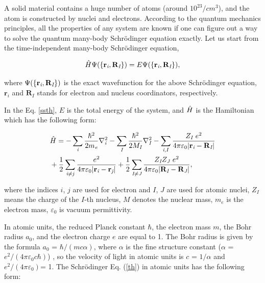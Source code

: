\documentclass[a4paper, 12pt, titlepage,oneside,drop]{kthesis}
\begin{document}
\noindent A solid material contains a huge number of atoms (around $10^{23}/cm^3$), and the atom is constructed by nuclei and electrons. 
According to the quantum mechanics principles, all the properties of any system are known if one can figure out a way to solve 
the quantum many-body Schrödinger equation exactly. Let us start from the time-independent many-body Schrödinger equation,

\begin{equation}\label{ssth}
 {\hat{H}} {\Psi(\{ {\textbf r}_{\textit i}, {\textbf R}_{\textit I} \})} = {E} {\Psi(\{ {\textbf r}_{\textit i}, {\textbf R}_{\textit I} \})},
\end{equation}

where $\Psi(\{ {\textbf r}_{\textit i}, {\textbf R}_{\textit I} \})$  is the exact wavefunction for the above Schrödinger equation, $\textbf{r}_\textit{i}$ and $\textbf{R}_\textit{I}$  stands for electron and
nucleus coordinators, respectively.

In the Eq. \ref{ssth}, $E$ is the total energy of the system, and $\hat{H}$ is the Hamiltonian which has the following form:

\begin{equation}\label{th}
\begin{split}
& \hath = - \sumi<i> {\frac{\hbar^{2}}{2 m_{\textit e}}}   \nablaia<i> - \sumi<I> {\frac{\hbar^{2}}{2 M_\textit{I}}} \nablaia<I>  - \sumij<i><I> \frac{Z_\textit{I}\ e^2}{4 \pi \varepsilon_0 |\textbf{r}_\textit{i}-\textbf{R}_\textit{I}|} \\
& + \frac{1}{2} \suminj<i><j> \frac{ e^2}{4 \pi \varepsilon_0 |\textbf{r}_\textit{i}-\textbf{r}_\textit{j}|} + \frac{1}{2} \suminj<I><J> \frac{Z_\textit{I} Z_\textit{J}\  e^2}{4 \pi \varepsilon_0 |\textbf{R}_\textit{I}-\textbf{R}_\textit{J}|},
\end{split}
\end{equation}

where the indices $\textit{i}$, $\textit{j}$ are used for electron and $\textit{I}$, $\textit{J}$ are used for atomic nuclei, $Z_\textit{I}$ means the charge of the $\textit{I}$-th nucleus,
$\textit{M}$ denotes the nuclear mass, $m_e$ is the electron mass, $\varepsilon_0$ is vacuum permittivity.

In atomic units, the reduced Planck constant $\hbar$, the electron mass $m$, the Bohr radius $a_0$, and the electron charge
$e$ are equal to 1. The Bohr radius is given by the formula $a_0$ = ${\hbar} / {(mc\alpha)}$, where $\alpha$ is the fine structure
constant ($\alpha$ = ${e^2}/{(4 \pi \varepsilon_0 c \hbar)}$) , so the velocity of light in atomic units is $c$ = $1/{\alpha}$ and ${e^2}/{(4 \pi \varepsilon_0)}$= 1. The Schrödinger Eq. (\ref{th}) in atomic units has 
the following form:
\end{document}
